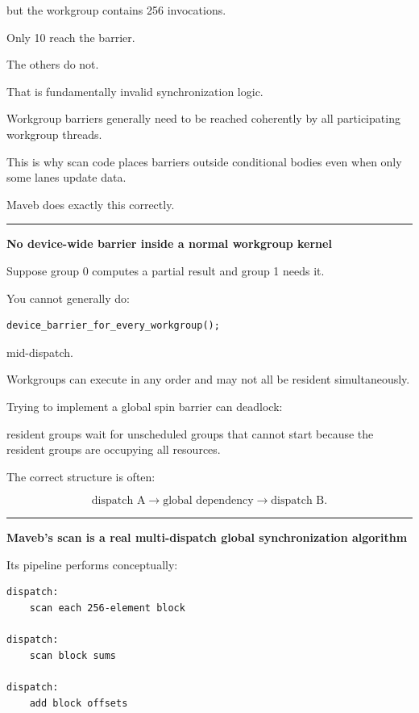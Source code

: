 but the workgroup contains 256 invocations.

Only 10 reach the barrier.

The others do not.

That is fundamentally invalid synchronization logic.

Workgroup barriers generally need to be reached coherently by all participating workgroup threads.

This is why scan code places barriers outside conditional bodies even when only some lanes update data.

Maveb does exactly this correctly.

\begin{center}\rule{0.5\linewidth}{0.5pt}\end{center}

\textbf{No device-wide barrier inside a normal workgroup kernel}

Suppose group 0 computes a partial result and group 1 needs it.

You cannot generally do:

\protect{}\label{o1fakh}%
\begin{verbatim}
device_barrier_for_every_workgroup();
\end{verbatim}

mid-dispatch.

Workgroups can execute in any order and may not all be resident simultaneously.

Trying to implement a global spin barrier can deadlock:

resident groups wait for unscheduled groups that cannot start because the resident groups are occupying all resources.

The correct structure is often:

\[
\boxed{
\text{dispatch A}
\rightarrow
\text{global dependency}
\rightarrow
\text{dispatch B}.
}
\]

\begin{center}\rule{0.5\linewidth}{0.5pt}\end{center}

\textbf{Maveb's scan is a real multi-dispatch global synchronization algorithm}

Its pipeline performs conceptually:

\protect{}\label{0mnqgj}%
\begin{verbatim}
dispatch:
    scan each 256-element block

dispatch:
    scan block sums

dispatch:
    add block offsets
\end{verbatim}

